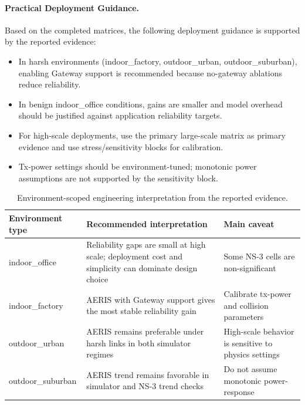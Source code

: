 ﻿\documentclass[sensors,article,submit,moreauthors,pdftex]{Definitions/mdpi}
\begin{document}
\paragraph{Practical Deployment Guidance.}
Based on the completed matrices, the following deployment guidance is supported by the reported evidence:
\begin{itemize}
\item In harsh environments (indoor\_factory, outdoor\_urban, outdoor\_suburban), enabling Gateway support is recommended because no-gateway ablations reduce reliability.
\item In benign indoor\_office conditions, gains are smaller and model overhead should be justified against application reliability targets.
\item For high-scale deployments, use the primary large-scale matrix as primary evidence and use stress/sensitivity blocks for calibration.
\item Tx-power settings should be environment-tuned; monotonic power assumptions are not supported by the sensitivity block.
\end{itemize}

\begin{table}[H]
\caption{Environment-scoped engineering interpretation from the reported evidence.}
\label{tab:deployment_summary}
\centering
\small
\begin{tabular}{>{\raggedright\arraybackslash}p{} >{\raggedright\arraybackslash}p{} >{\raggedright\arraybackslash}p{}}
\toprule
Environment type & Recommended interpretation & Main caveat \\
\midrule
indoor\_office & Reliability gaps are small at high scale; deployment cost and simplicity can dominate design choice & Some NS-3 cells are non-significant \\
indoor\_factory & AERIS with Gateway support gives the most stable reliability gain & Calibrate tx-power and collision parameters \\
outdoor\_urban & AERIS remains preferable under harsh links in both simulator regimes & High-scale behavior is sensitive to physics settings \\
outdoor\_suburban & AERIS trend remains favorable in simulator and NS-3 trend checks & Do not assume monotonic power-response \\
\bottomrule
\end{tabular}
\normalsize
\end{table}
\end{document}
